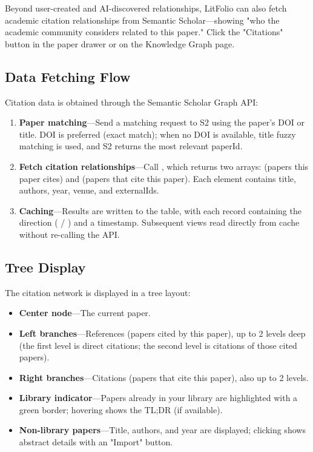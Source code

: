 Beyond user-created and AI-discovered relationships, LitFolio can also fetch academic citation
relationships from Semantic Scholar---showing "who the academic community considers related to this
paper." Click the "Citations" button in the paper drawer or on the Knowledge Graph page.


\subsection{Data Fetching Flow}

Citation data is obtained through the Semantic Scholar Graph API:

\begin{enumerate}
  \item \textbf{Paper matching}---Send a matching request to S2 using the paper's DOI or title.
    DOI is preferred (exact match); when no DOI is available, title fuzzy matching is used, and S2
    returns the most relevant paperId.
  \item \textbf{Fetch citation relationships}---Call ,
    which returns two arrays:  (papers this paper cites) and 
    (papers that cite this paper). Each element contains title, authors, year, venue, and
    externalIds.
  \item \textbf{Caching}---Results are written to the  table, with each
    record containing the direction ( / ) and a 
    timestamp. Subsequent views read directly from cache without re-calling the API.
\end{enumerate}

\subsection{Tree Display}

The citation network is displayed in a tree layout:

\begin{itemize}
  \item \textbf{Center node}---The current paper.
  \item \textbf{Left branches}---References (papers cited by this paper), up to 2 levels deep
    (the first level is direct citations; the second level is citations of those cited papers).
  \item \textbf{Right branches}---Citations (papers that cite this paper), also up to 2 levels.
  \item \textbf{Library indicator}---Papers already in your library are highlighted with a green
    border; hovering shows the TL;DR (if available).
  \item \textbf{Non-library papers}---Title, authors, and year are displayed; clicking shows
    abstract details with an "Import" button.
\end{itemize}

